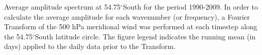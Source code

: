 \label{fig:fourier_spectrum}
Average amplitude spectrum at 54.75$^{\circ}$South for the period 1990-2009. In order to calculate the average amplitude for each wavenumber (or frequency), a Fourier Transform of the 500 hPa meridional wind was performed at each timestep along the 54.75$^{\circ}$South latitude circle. The figure legend indicates the running mean (in days) applied to the daily data prior to the Transform.  